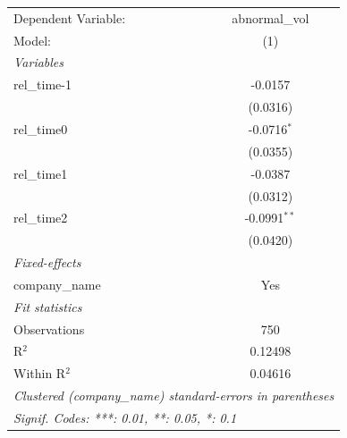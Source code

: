 
\begingroup
\centering
\begin{tabular}{lc}
   \tabularnewline \midrule \midrule
   Dependent Variable: & abnormal\_vol\\   
   Model:              & (1)\\  
   \midrule
   \emph{Variables}\\
   rel\_time-1         & -0.0157\\   
                       & (0.0316)\\   
   rel\_time0          & -0.0716$^{*}$\\   
                       & (0.0355)\\   
   rel\_time1          & -0.0387\\   
                       & (0.0312)\\   
   rel\_time2          & -0.0991$^{**}$\\   
                       & (0.0420)\\   
   \midrule
   \emph{Fixed-effects}\\
   company\_name       & Yes\\  
   \midrule
   \emph{Fit statistics}\\
   Observations        & 750\\  
   R$^2$               & 0.12498\\  
   Within R$^2$        & 0.04616\\  
   \midrule \midrule
   \multicolumn{2}{l}{\emph{Clustered (company\_name) standard-errors in parentheses}}\\
   \multicolumn{2}{l}{\emph{Signif. Codes: ***: 0.01, **: 0.05, *: 0.1}}\\
\end{tabular}
\par\endgroup



